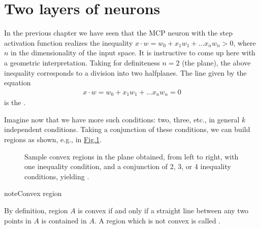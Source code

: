 \documentclass[letterpaper,10pt,english]{jupyterBook}
\let\sphinxpxdimen\pdfpxdimen\else\newdimen\sphinxpxdimen
\begin{document}
\section{Two layers of neurons}
\label{\detokenize{docs/more_layers:two-layers-of-neurons}}
\sphinxAtStartPar
In the previous chapter we have seen that the MCP neuron with the step activation function realizes the inequality \(x \cdot w=w_0+x_1 w_1 + \dots x_n w_n > 0\), where \(n\) in the dimensionality of the input space. It is instructive to come up here with a geometric interpretation. Taking for definiteness \(n=2\) (the plane), the above inequality corresponds to a division into two half\sphinxhyphen{}planes. The line given by the equation
\begin{equation*}
\begin{split}x \cdot w=w_0+x_1 w_1 + \dots x_n w_n = 0\end{split}
\end{equation*}
\sphinxAtStartPar
is the .

\sphinxAtStartPar
Imagine now that we have more such conditions: two, three, etc., in general \(k\) independent conditions. Taking a conjunction of these conditions, we can build regions as shown, e.g., in \hyperref[\detokenize{docs/more_layers:regions-fig}]{Fig.\@ \ref{\detokenize{docs/more_layers:regions-fig}}}.

\begin{figure}[htbp]
\centering
\capstart

\noindent\sphinxincludegraphics[width=620\sphinxpxdimen]{{regions}.png}
\caption{Sample convex regions in the plane obtained, from left to right, with one inequality condition, and a conjunction of 2, 3, or 4 inequality conditions, yielding .}\label{\detokenize{docs/more_layers:regions-fig}}\end{figure}

\begin{sphinxadmonition}{note}{Convex region}

\sphinxAtStartPar
By definition, region \(A\) is convex if and only if a straight line between any two points in \(A\) is contained in \(A\). A region which is not convex is called .
\end{sphinxadmonition}
\end{document}
